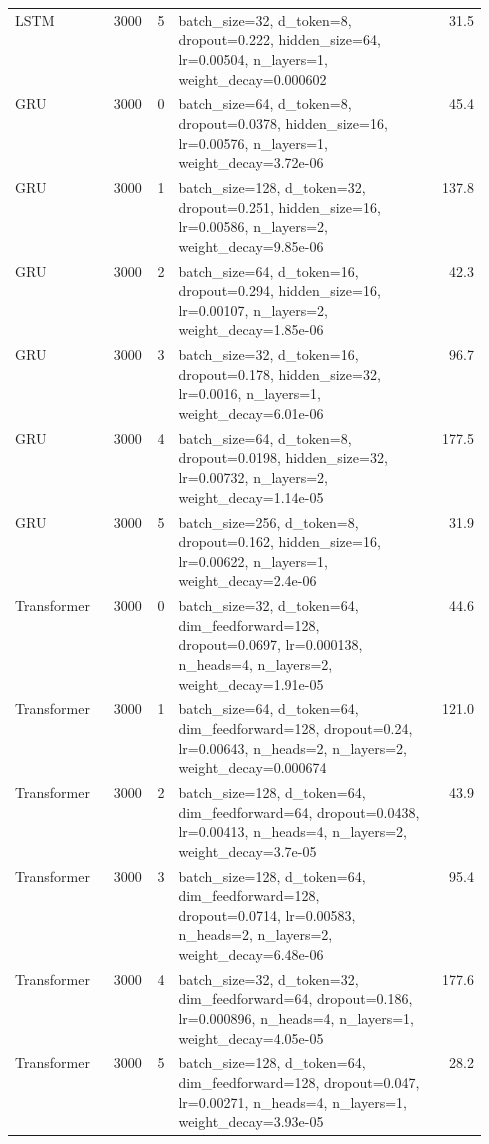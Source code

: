 \begin{longtable}{lrrp{0.55\linewidth}r}
LSTM & 3000 & 5 & batch\_size=32, d\_token=8, dropout=0.222, hidden\_size=64, lr=0.00504, n\_layers=1, weight\_decay=0.000602 & 31.5 \\
GRU & 3000 & 0 & batch\_size=64, d\_token=8, dropout=0.0378, hidden\_size=16, lr=0.00576, n\_layers=1, weight\_decay=3.72e-06 & 45.4 \\
GRU & 3000 & 1 & batch\_size=128, d\_token=32, dropout=0.251, hidden\_size=16, lr=0.00586, n\_layers=2, weight\_decay=9.85e-06 & 137.8 \\
GRU & 3000 & 2 & batch\_size=64, d\_token=16, dropout=0.294, hidden\_size=16, lr=0.00107, n\_layers=2, weight\_decay=1.85e-06 & 42.3 \\
GRU & 3000 & 3 & batch\_size=32, d\_token=16, dropout=0.178, hidden\_size=32, lr=0.0016, n\_layers=1, weight\_decay=6.01e-06 & 96.7 \\
GRU & 3000 & 4 & batch\_size=64, d\_token=8, dropout=0.0198, hidden\_size=32, lr=0.00732, n\_layers=2, weight\_decay=1.14e-05 & 177.5 \\
GRU & 3000 & 5 & batch\_size=256, d\_token=8, dropout=0.162, hidden\_size=16, lr=0.00622, n\_layers=1, weight\_decay=2.4e-06 & 31.9 \\
Transformer & 3000 & 0 & batch\_size=32, d\_token=64, dim\_feedforward=128, dropout=0.0697, lr=0.000138, n\_heads=4, n\_layers=2, weight\_decay=1.91e-05 & 44.6 \\
Transformer & 3000 & 1 & batch\_size=64, d\_token=64, dim\_feedforward=128, dropout=0.24, lr=0.00643, n\_heads=2, n\_layers=2, weight\_decay=0.000674 & 121.0 \\
Transformer & 3000 & 2 & batch\_size=128, d\_token=64, dim\_feedforward=64, dropout=0.0438, lr=0.00413, n\_heads=4, n\_layers=2, weight\_decay=3.7e-05 & 43.9 \\
Transformer & 3000 & 3 & batch\_size=128, d\_token=64, dim\_feedforward=128, dropout=0.0714, lr=0.00583, n\_heads=2, n\_layers=2, weight\_decay=6.48e-06 & 95.4 \\
Transformer & 3000 & 4 & batch\_size=32, d\_token=32, dim\_feedforward=64, dropout=0.186, lr=0.000896, n\_heads=4, n\_layers=1, weight\_decay=4.05e-05 & 177.6 \\
Transformer & 3000 & 5 & batch\_size=128, d\_token=64, dim\_feedforward=128, dropout=0.047, lr=0.00271, n\_heads=4, n\_layers=1, weight\_decay=3.93e-05 & 28.2 \\
\end{longtable}
